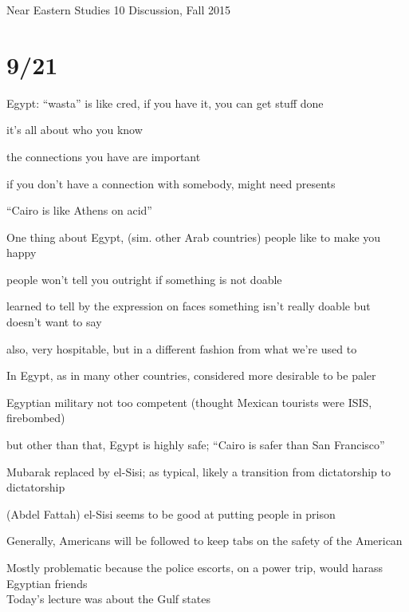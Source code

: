 \documentclass[12pt]{article}
\begin{document}
\noindent
Near Eastern Studies 10 Discussion, Fall 2015

\section{9/21}

Egypt: ``wasta'' is like cred, if you have it, you can get stuff done

it's all about who you know

the connections you have are important

if you don't have a connection with somebody, might need presents

``Cairo is like Athens on acid''

\noindent
One thing about Egypt, (sim. other Arab countries) people like to make you happy

people won't tell you outright if something is not doable

learned to tell by the expression on faces something isn't really doable but doesn't want to say

also, very hospitable, but in a different fashion from what we're used to

\noindent
In Egypt, as in many other countries, considered more desirable to be paler

\noindent
Egyptian military not too competent (thought Mexican tourists were ISIS, firebombed)

but other than that, Egypt is highly safe; ``Cairo is safer than San Francisco''

\noindent
Mubarak replaced by el-Sisi; as typical, likely a transition from dictatorship to dictatorship

(Abdel Fattah) el-Sisi seems to be good at putting people in prison

\noindent
Generally, Americans will be followed to keep tabs on the safety of the American

Mostly problematic because the police escorts, on a power trip, would harass Egyptian friends\\

\noindent
Today's lecture was about the Gulf states
\end{document}
